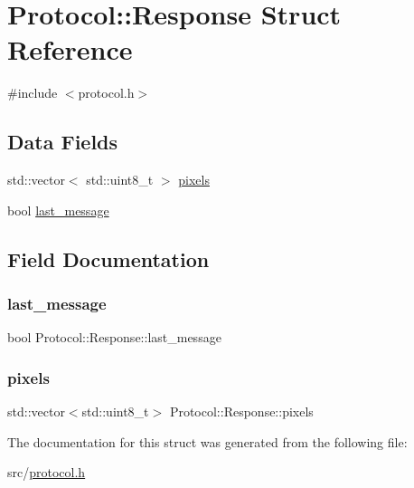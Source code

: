 \hypertarget{structProtocol_1_1Response}{}\section{Protocol\+:\+:Response Struct Reference}
\label{structProtocol_1_1Response}


{\ttfamily \#include $<$protocol.\+h$>$}

\subsection*{Data Fields}
\begin{DoxyCompactItemize}
\item 
std\+::vector$<$ std\+::uint8\+\_\+t $>$ \hyperlink{structProtocol_1_1Response_a5581498781fbccae5bb6082a37a23e6b}{pixels}
\item 
bool \hyperlink{structProtocol_1_1Response_a494170c5e2442a8d35e1227f40683ec1}{last\+\_\+message}
\end{DoxyCompactItemize}


\subsection{Field Documentation}
\mbox{\label{structProtocol_1_1Response_a494170c5e2442a8d35e1227f40683ec1}} 
\subsubsection{\texorpdfstring{last\+\_\+message}{last\_message}}
{\footnotesize\ttfamily bool Protocol\+::\+Response\+::last\+\_\+message}

\mbox{\label{structProtocol_1_1Response_a5581498781fbccae5bb6082a37a23e6b}} 
\subsubsection{\texorpdfstring{pixels}{pixels}}
{\footnotesize\ttfamily std\+::vector$<$std\+::uint8\+\_\+t$>$ Protocol\+::\+Response\+::pixels}



The documentation for this struct was generated from the following file\+:\begin{DoxyCompactItemize}
\item 
src/\hyperlink{protocol_8h}{protocol.\+h}\end{DoxyCompactItemize}

